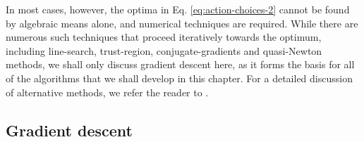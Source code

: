 \begin{mccorrection}
In most cases, however, the optima in Eq. \eqref{eq:action-choices-2} cannot be found by algebraic means alone, and numerical techniques are required. While there are numerous such techniques that proceed iteratively towards the optimum, including line-search, trust-region, conjugate-gradients and quasi-Newton methods, we shall only discuss gradient descent here, as it forms the basis for all of the algorithms that we shall develop in this chapter. For a detailed discussion of alternative methods, we refer the reader to \citep{nocedal}.
\end{mccorrection}

\subsection{Gradient descent}

